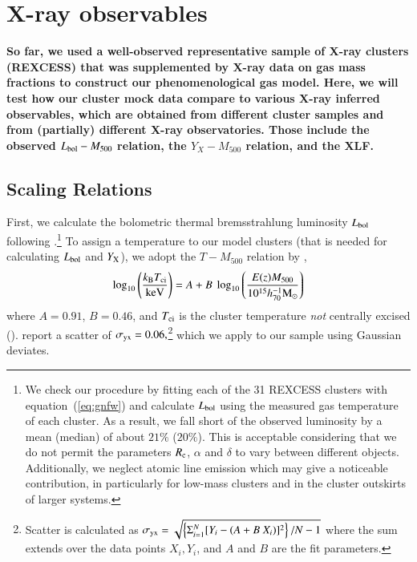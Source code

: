 \documentclass[useAMS,usenatbib]{mn2e}
\begin{document}
\section{X-ray  observables}
\label{sec:4}

{\bf So far, we used a well-observed representative sample of X-ray clusters
(REXCESS) that was supplemented by X-ray data on gas mass fractions to construct
our phenomenological gas model.  Here, we will test how our cluster mock data
compare to various X-ray inferred observables, which are obtained from different
cluster samples and from (partially) different X-ray observatories. Those
include the observed $L_{{\mathrm{bol}}} - M_{500}$ relation, the $Y_X - M_{500}$
relation, and the XLF.}

\subsection{Scaling Relations}

First, we calculate the bolometric thermal bremsstrahlung luminosity
$L_{{\mathrm{bol}}}$ following \cite{1988xrec.book.....S}.\footnote{We check our
  procedure by fitting each of the 31 REXCESS clusters with
  equation~(\ref{eq:gnfw}) and calculate $L_{{\mathrm{bol}}}$ using the measured gas
  temperature of each cluster. As a result, we fall short of the observed
  luminosity by a mean (median) of about $21\%$ ($20\%$). This is acceptable
  considering that we do not permit the parameters $R_{{\mathrm{c}}}$, $\alpha$ and
  $\delta$ to vary between different objects. Additionally, we neglect atomic
  line emission which may give a noticeable contribution, in particularly for
  low-mass clusters and in the cluster outskirts of larger systems.}  To assign
a temperature to our model clusters (that is needed for calculating
$L_{{\mathrm{bol}}}$ and $Y_{{\mathrm{X}}}$), we adopt the $T-M_{500}$ relation by
\cite{2010MNRAS.406.1773M},
\begin{equation}
\log_{10} \left( \frac{k_{{\mathrm{B}}}T_{{\mathrm{ci}}}}{{\mathrm{keV}}} \right) = 
A + B~\log_{10} \left( \frac{E(z) M_{500}}{10^{15} h_{70}^{-1} {\mathrm{M_{\odot}}}} \right)
\label{eq:temp}
\end{equation}
where $A=0.91$, $B=0.46$, and $T_{{\mathrm{ci}}}$ is the cluster temperature
\emph{not} centrally excised
(\citealp{2010MNRAS.406.1773M}). \cite{2010MNRAS.406.1773M} report a scatter of
$\sigma_{{\mathrm{yx}}} = 0.06,$\footnote{Scatter is calculated as $\sigma_{{\mathrm{yx}}}
  = \sqrt{ \left\{ \Sigma_{i=1}^{N} [Y_{i}-(A+B~X_{i})]^{2}\right\} / N-1}$
  where the sum extends over the data points $X_{i}, Y_{i}$, and $A$ and $B$ are
  the fit parameters.} which we apply to our sample using Gaussian deviates.
\end{document}
